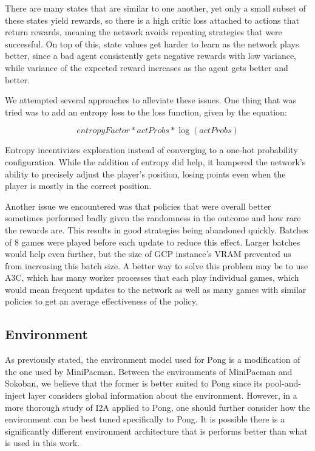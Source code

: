\documentclass[10pt, twocolumn]{article}
\begin{document}

	There are many states that are similar to one another, yet only a small subset of these states yield rewards, so there is a high critic loss attached to actions that return rewards, meaning the network avoids repeating strategies that were successful. On top of this, state values get harder to learn as the network plays better, since a bad agent consistently gets negative rewards with low variance, while variance of the expected reward increases as the agent gets better and better.

      We attempted several approaches to alleviate these issues. One thing that was tried was to add an entropy loss to the loss function, given by the equation: 
      
      \[ entropyFactor* actProbs*\log(actProbs) \]

	Entropy incentivizes exploration instead of converging to a one-hot probability configuration. While the addition of entropy did help, it hampered the network’s ability to precisely adjust the player's position, losing points even when the player is mostly in the correct position.

	Another issue we encountered was that policies that were overall better sometimes performed badly given the randomness in the outcome and how rare the rewards are. This results in good strategies being abandoned quickly. Batches of 8 games were played before each update to reduce this effect. Larger batches would help even further, but the size of GCP instance's VRAM prevented us from increasing this batch size. A better way to solve this problem may be to use A3C, which has many worker processes that each play individual games, which would mean frequent updates to the network as well as many games with similar policies to get an average effectiveness of the policy. 



\subsection{Environment}
As previously stated, the environment model used for Pong is a modification of the one used by MiniPacman. Between the environments of MiniPacman and Sokoban, we believe that the former is better suited to Pong since its pool-and-inject layer considers global information about the environment. However, in a more thorough study of I2A applied to Pong, one should further consider how the environment can be best tuned specifically to Pong. It is possible there is a significantly different environment architecture that is performs better than what is used in this work.
\end{document}
